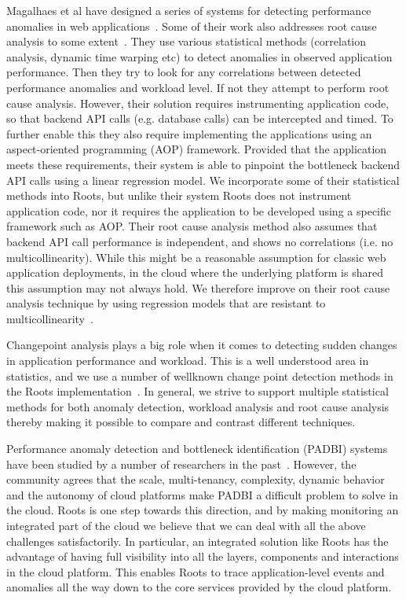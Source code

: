 Magalhaes et al have designed a series of systems for detecting
performance anomalies in web applications~\cite{5598229}. Some of their work
also addresses root cause analysis to some extent~\cite{Magalhaes:2011:RAP:1982185.1982234}. 
They use
various statistical methods (correlation analysis, dynamic time
warping etc) to detect anomalies in observed application
performance. Then they try to look for any correlations between
detected performance anomalies and workload level. If not
they attempt to perform root cause analysis. However, their
solution requires instrumenting application code, so that
backend API calls (e.g. database calls) can be intercepted and timed. To further
enable this they also require implementing the applications 
using an aspect-oriented programming (AOP) framework. Provided that
the application meets these requirements, their system is able to
pinpoint the bottleneck backend API calls using a linear regression
model. We incorporate some of their statistical methods into Roots,
but unlike their system Roots does not instrument application code, nor
it requires the application to be developed using a specific framework
such as AOP. Their root cause analysis method also assumes that
backend API call performance is independent, and shows no correlations
(i.e. no multicollinearity).
While this might be a reasonable assumption for classic web application
deployments, in the cloud where the underlying platform is shared
this assumption may not always hold. We therefore improve on their
root cause analysis technique by using regression models that are
resistant to multicollinearity~\cite{JSSv017i01}.

Changepoint analysis plays a big role when it comes to detecting
sudden changes in application performance and workload. This is a well
understood area in statistics, and we use a number of wellknown 
change point detection methods in the Roots implementation~\cite{killick2012optimal,cl93,bereznay2006did}. 
In general, we strive to support multiple statistical methods for
both anomaly detection, workload analysis and root cause analysis
thereby making it possible to compare and contrast different techniques.

Performance anomaly detection and bottleneck identification (PADBI) systems
have been studied by a number of researchers in the past~\cite{Ibidunmoye:2015:PAD:2808687.2791120}. 
However,
the community agrees that the scale, multi-tenancy, complexity,
dynamic behavior and the autonomy of cloud platforms make PADBI a
difficult problem to solve in the cloud. Roots is one step towards this direction,
and by making monitoring an integrated part of the cloud we believe
that we can deal with all the above challenges satisfactorily. In 
particular, an integrated solution like Roots has the advantage of
having full visibility into all the layers, components and interactions
in the cloud platform. This enables Roots to trace application-level
events and anomalies all the way down to the core services provided
by the cloud platform.
